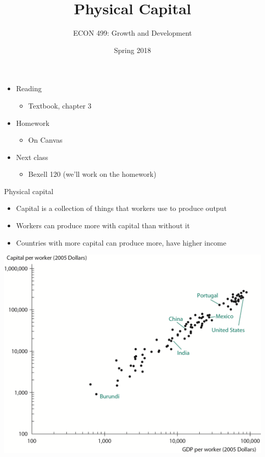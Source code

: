 \documentclass[10pt]{beamer}
\author{ECON 499: Growth and Development}
\date{Spring 2018}
\title{Physical Capital}
\begin{document}
\maketitle

\begin{frame}[label={sec:org32451db}]{}
\begin{itemize}
\item Reading
\begin{itemize}
\item Textbook, chapter 3
\end{itemize}

\item Homework
\begin{itemize}
\item On Canvas
\end{itemize}

\item Next class
\begin{itemize}
\item Bexell 120 (we'll work on the homework)
\end{itemize}
\end{itemize}
\end{frame}

\begin{frame}[label={sec:org0948660}]{}
\alert{Physical capital}
\begin{itemize}
\item Capital is a collection of things that workers use to produce output
\item Workers can produce more with capital than without it
\item Countries with more capital can produce more, have higher income
\end{itemize}
\end{frame}

\begin{frame}[label={sec:org16b7b57}]{}
\begin{center}
\includegraphics[width=.75\textwidth]{./img/3.1.png}
\end{center}
\end{frame}
\end{document}
